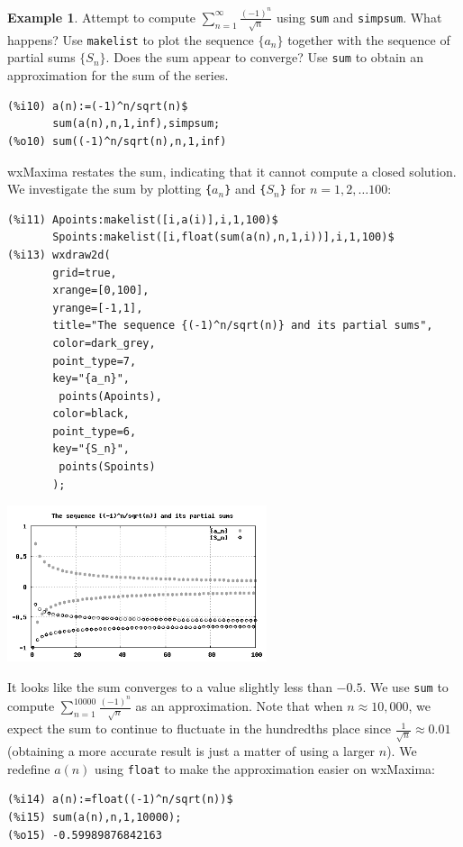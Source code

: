 \documentclass[10.5pt,twoside]{report}
\theoremstyle{definition}
\newtheorem{exmp}{Example}[section]
\begin{document}
\begin{exmp} Attempt to compute $\sum_{n=1}^{\infty} \frac{(-1)^n}{\sqrt{n}}$ using \verb|sum| and \verb|simpsum|.  What happens? Use \verb|makelist| to plot the sequence $\lbrace a_n \rbrace$ together with the sequence of partial sums $\lbrace S_n \rbrace$.  Does the sum appear to converge?  Use \verb|sum| to obtain an approximation for the sum of the series.\\


\begin{verbatim}
(%i10) a(n):=(-1)^n/sqrt(n)$
       sum(a(n),n,1,inf),simpsum;
(%o10) sum((-1)^n/sqrt(n),n,1,inf)
\end{verbatim}

wxMaxima restates the sum, indicating that it cannot compute a closed solution.  We investigate the sum by plotting \verb|{|$a_n$\verb|}| and \verb|{|$S_n$\verb|}| for $n=1,2,\dots 100$:

\begin{verbatim}
(%i11) Apoints:makelist([i,a(i)],i,1,100)$
       Spoints:makelist([i,float(sum(a(n),n,1,i))],i,1,100)$
(%i13) wxdraw2d(
       grid=true,
       xrange=[0,100],
       yrange=[-1,1],
       title="The sequence {(-1)^n/sqrt(n)} and its partial sums",
       color=dark_grey,
       point_type=7,
       key="{a_n}",
        points(Apoints),
       color=black,
       point_type=6,
       key="{S_n}",
        points(Spoints)
       );
\end{verbatim}

\includegraphics[width=3in]{example_6_2_3_1}

It looks like the sum converges to a value slightly less than $-0.5$.  We use \verb|sum| to compute $ \sum_{n=1}^{10000} \frac{(-1)^n}{\sqrt{n}}$ as an approximation.  Note that when $n\approx 10,000$, we expect the sum to continue to fluctuate in the hundredths place since $\frac{1}{\sqrt{n}}\approx 0.01$ (obtaining a more accurate result is just a matter of using a larger $n$).  We redefine $a(n)$ using \verb|float| to make the approximation easier on wxMaxima:

\begin{verbatim}
(%i14) a(n):=float((-1)^n/sqrt(n))$
(%i15) sum(a(n),n,1,10000);
(%o15) -0.59989876842163
\end{verbatim}

\end{exmp}
\end{document}
